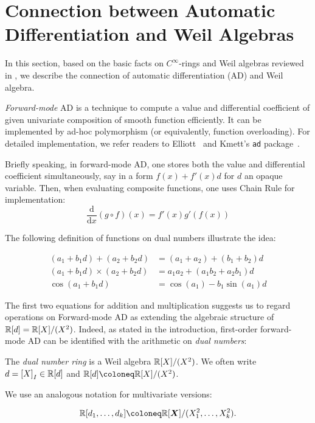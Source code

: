 \documentclass[%
  sigconf,authorversion,screen]{acmart}
\begin{document}
\section{Connection between Automatic Differentiation and Weil Algebras}
\label{sec:ad-and-weils}
In this section, based on the basic facts on $C^\infty$-rings and Weil algebras reviewed in , we describe the connection of automatic differentiation (AD) and Weil algebra.

\emph{Forward-mode} AD is a technique to compute a value and differential coefficient of given univariate composition of smooth function efficiently.
It can be implemented by ad-hoc polymorphism (or equivalently, function overloading).
For detailed implementation, we refer readers to Elliott~\cite{Elliott2009-beautiful-differentiation} and Kmett's \texttt{ad} package~\cite{Kmett:2010aa}.

Briefly speaking, in forward-mode AD, one stores both the value and differential coefficient simultaneously, say in a form $f(x) + f'(x) d$ for $d$ an opaque variable.
Then, when evaluating composite functions, one uses Chain Rule for implementation:
\[
  \frac{\mathrm{d}}{\mathrm{d}x}(g \circ f)(x) = f'(x) g'(f(x))
\]

The following definition of functions on dual numbers illustrate the idea:

\begin{align*}
  (a_1 + b_1 d) + (a_2 + b_2 d) &= (a_1 + a_2) + (b_1 + b_2)d\\
  (a_1 + b_1 d) \times (a_2 + b_2 d) &= a_1 a_2 + (a_1 b_2 + a_2 b_1)d\\
  \cos(a_1 + b_1 d) &= \cos(a_1) - b_1 \sin(a_1) d
\end{align*}

The first two equations for addition and multiplication suggests us to regard operations on Forward-mode AD as extending the algebraic structure of $\mathbb{R}[d] = \mathbb{R}[X]/(X^2)$.
Indeed, as stated in the introduction, first-order forward-mode AD can be identified with the arithmetic on \emph{dual numbers}:
\begin{definition}
  The \emph{dual number ring} is a Weil algebra $\mathbb{R}[X]/(X^2)$.
  We often write $d = {[X]}_I \in \mathbb{R}[d]$ and $\R[d] \coloneq \R[X]/(X^2)$.

  We use an analogous notation for multivariate versions:
  
  \[
    \R[d_1, \dots, d_k] \coloneq \R[\X]/(X_1^2, \dots, X_k^2).
  \]
\end{definition}
\end{document}
